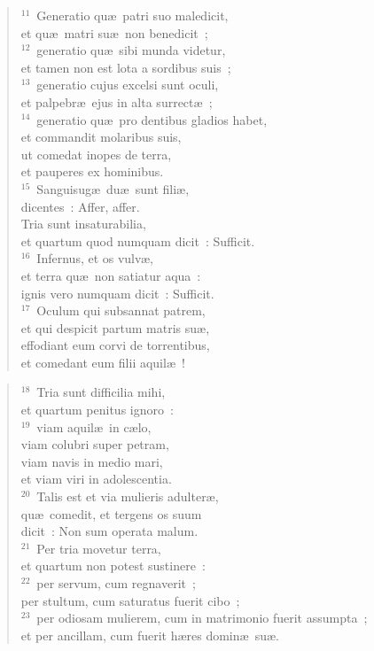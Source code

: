 \begin{flushleft}\begin{verse}${}^{11}$~Generatio qu\ae\ patri suo maledicit,\\ et qu\ae\ matri su\ae\ non benedicit~;\\
${}^{12}$~generatio qu\ae\ sibi munda videtur,\\ et tamen non est lota a sordibus suis~;\\
${}^{13}$~generatio cujus excelsi sunt oculi,\\ et palpebr\ae\ ejus in alta surrect\ae~;\\
${}^{14}$~generatio qu\ae\ pro dentibus gladios habet,\\ et commandit molaribus suis,\\ ut comedat inopes de terra,\\ et pauperes ex hominibus.\\
${}^{15}$~Sanguisug\ae\ du\ae\ sunt fili\ae ,\\ dicentes~: Affer, affer.\\ Tria sunt insaturabilia,\\ et quartum quod numquam dicit~: Sufficit.\\
${}^{16}$~Infernus, et os vulv\ae ,\\ et terra qu\ae\ non satiatur aqua~:\\ ignis vero numquam dicit~: Sufficit.\\
${}^{17}$~Oculum qui subsannat patrem,\\ et qui despicit partum matris su\ae ,\\ effodiant eum corvi de torrentibus,\\ et comedant eum filii aquil\ae~!\end{verse}\end{flushleft}


\begin{flushleft}\begin{verse}${}^{18}$~Tria sunt difficilia mihi,\\ et quartum penitus ignoro~:\\
${}^{19}$~viam aquil\ae\ in c\ae lo,\\ viam colubri super petram,\\ viam navis in medio mari,\\ et viam viri in adolescentia.\\
${}^{20}$~Talis est et via mulieris adulter\ae ,\\ qu\ae\ comedit, et tergens os suum\\ dicit~: Non sum operata malum.\\
${}^{21}$~Per tria movetur terra,\\ et quartum non potest sustinere~:\\
${}^{22}$~per servum, cum regnaverit~;\\ per stultum, cum saturatus fuerit cibo~;\\
${}^{23}$~per odiosam mulierem, cum in matrimonio fuerit assumpta~;\\ et per ancillam, cum fuerit h\ae res domin\ae\ su\ae .\end{verse}\end{flushleft}



